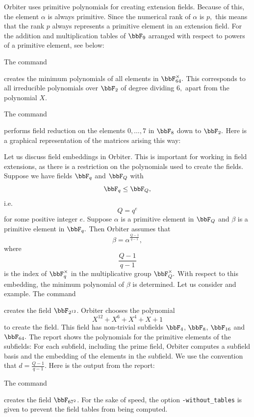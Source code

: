Orbiter uses primitive polynomials for creating extension fields. 
Because of this, 
the element $\alpha$ is always primitive. 
Since the numerical rank of $\alpha$ is $p,$ this means that the rank $p$ 
always represents a primitive element in an extension field.
For the addition and multiplication tables of $\bbF_{9}$ 
arranged with respect to powers of a primitive element, see below:

\bigskip


The command  


creates the minimum polynomials of all elements in $\bbF_{64}^\times.$ 
This corresponds to all irreducible polynomials over $\bbF_2$ 
of degree dividing $6,$ apart from the polynomial $X.$

\bigskip

The command  


performs field reduction on the elements $0,\ldots,7$ in $\bbF_8$ down to $\bbF_2.$ 
Here is a graphical representation of the matrices arising this way:



\bigskip

Let us discuss field embeddings in Orbiter. 
This is important for working in field extensions, 
as there is a restriction on the polynomials used to create the fields.
Suppose we have fields $\bbF_q$ and $\bbF_Q$
with
$$
\bbF_q \le \bbF_Q,
$$
i.e. 
$$
Q = q^e
$$
for some positive integer $e.$
Suppose $\alpha$ is a primitive element 
in $\bbF_Q$ and $\beta$ is a primitive element in $\bbF_q.$
Then Orbiter assumes that  
$$
\beta = \alpha^{\frac{Q-1}{q-1}},
$$
where 
$$
\frac{Q-1}{q-1}
$$
is the index of $\bbF_q^\times$ 
in the multiplicative group $\bbF_Q^\times.$ 
With respect to this embedding, 
the minimum polynomial of $\beta$ is determined. 
Let us consider and example.
The command  


creates the field $\bbF_{2^{12}}$. 
Orbiter chooses the polynomial 
$$
X^{12} + X^{6} + X^{4} + X + 1
$$
to create the field.
This field has non-trivial subfields $\bbF_4$, $\bbF_8$, $\bbF_{16}$ and $\bbF_{64}.$
The report shows the polynomials for the primitive elements of the subfields:
For each subfield, including the prime field, 
Orbiter computes a subfield basis and the embedding of the elements in the subfield. 
We use the convention that $d=\frac{Q-1}{q-1}.$
Here is the output from the report:




\bigskip




The command  


creates the field $\bbF_{67^2}$. For the sake of speed, 
the option \verb'-without_tables' is given to prevent the field tables from being computed. 


\bigskip

